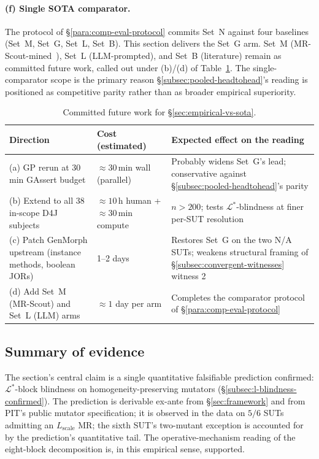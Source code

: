 \paragraph{(f) Single SOTA comparator.}
The protocol of \S\ref{para:comp-eval-protocol} commits Set~N
against four baselines (Set~M, Set~G, Set~L, Set~B). This section
delivers the Set~G arm. Set~M (MR-Scout-mined~\cite{MRScout2024}),
Set~L (LLM-prompted), and Set~B (literature) remain as committed
future work, called out under (b)/(d) of Table~\ref{tab:future-work}.
The single-comparator scope is the primary reason
\S\ref{subsec:pooled-headtohead}'s reading is positioned as
competitive parity rather than as broader empirical superiority.

\begin{table}[h]
\centering
\caption{Committed future work for \S\ref{sec:empirical-vs-sota}.}
\label{tab:future-work}
\small
\begin{tabular}{lll}
\toprule
Direction & Cost (estimated) & Expected effect on the reading \\
\midrule
(a) GP rerun at 30\,min GAssert budget                       & $\approx 30$\,min wall (parallel) & Probably widens Set~G's lead; conservative against \S\ref{subsec:pooled-headtohead}'s parity \\
(b) Extend to all 38 in-scope D4J subjects                    & $\approx 10$\,h human + $\approx 30$\,min compute & $n > 200$; tests $\mathcal{L}^{*}$-blindness at finer per-SUT resolution \\
(c) Patch GenMorph upstream (instance methods, boolean JORs)  & 1--2 days                         & Restores Set~G on the two N/A SUTs; weakens structural framing of \S\ref{subsec:convergent-witnesses} witness 2 \\
(d) Add Set~M (MR-Scout) and Set~L (LLM) arms                  & $\approx 1$ day per arm           & Completes the comparator protocol of \S\ref{para:comp-eval-protocol} \\
\bottomrule
\end{tabular}
\end{table}

\subsection{Summary of evidence}
\label{subsec:empirical-summary}

The section's central claim is a single quantitative falsifiable
prediction confirmed: $\mathcal{L}^{*}$-block blindness on
homogeneity-preserving mutators
(\S\ref{subsec:l-blindness-confirmed}). The prediction is derivable
ex-ante from \S\ref{sec:framework} and from PIT's public mutator
specification; it is observed in the data on $5/6$ SUTs admitting an
$L_{\mathrm{scale}}$ MR; the sixth SUT's two-mutant exception is
accounted for by the prediction's quantitative tail. The
operative-mechanism reading of the eight-block decomposition is, in
this empirical sense, supported.

